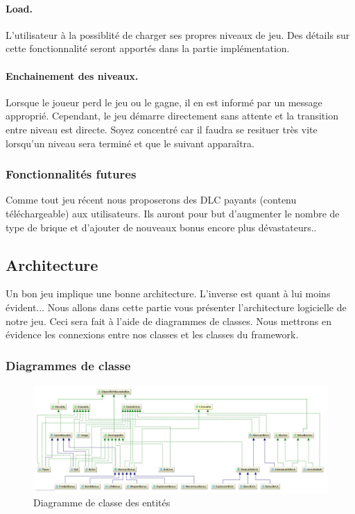 \documentclass[a4paper,10pt]{article}
\begin{document}
		\paragraph{Load.} L'utilisateur à la possiblité de charger ses propres niveaux de jeu. Des détails sur cette fonctionnalité
		seront apportés dans la partie implémentation.	
		
        \paragraph{Enchainement des niveaux. } Lorsque le joueur perd le jeu ou le gagne, il en est informé par un message approprié. Cependant, le jeu démarre
        directement sans attente et la transition entre niveau est directe. Soyez concentré car il faudra
        se resituer très vite lorsqu'un niveau sera terminé et que le suivant apparaîtra.

	\subsubsection{Fonctionnalités futures}
		Comme tout jeu récent nous proposerons des DLC payants (contenu téléchargeable) aux utilisateurs. Ils auront pour but
		d'augmenter le nombre de type de brique et d'ajouter de nouveaux bonus encore plus dévastateurs..

\subsection{Architecture}
    Un bon jeu implique une bonne architecture. L'inverse est quant à lui moins évident...
	Nous allons dans cette partie vous présenter l'architecture logicielle de notre jeu. Ceci sera fait à l'aide de
	diagrammes de classes.
	Nous mettrons en évidence les connexions entre nos classes et les classes du framework.

	\newpage
	\subsubsection{Diagrammes de classe}

		\FloatBarrier
		\begin{figure}[!h]
    		\begin{center}
	  	  	\includegraphics[scale=0.170]{images/whiteEntityDiagram.jpg}
          	\caption{Diagramme de classe des entités}
    		\end{center}
		\end{figure}
		\FloatBarrier
\end{document}
